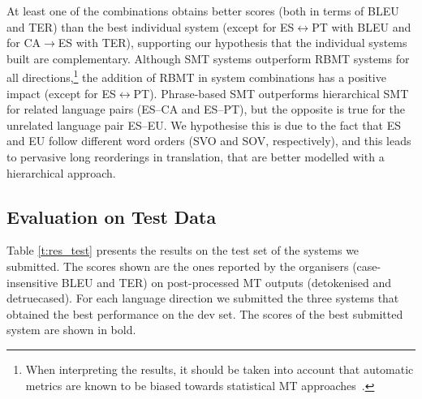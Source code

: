 \documentclass[postprint]{flammie}
\begin{document}

At least one of the combinations obtains better scores (both in terms of BLEU and TER) than the best individual system (except for ES$\leftrightarrow$PT with BLEU and for CA$\rightarrow$ES with TER), supporting our hypothesis that the individual systems built are complementary.
Although SMT systems outperform RBMT systems for all directions,\footnote{When interpreting the results, it should be taken into account that automatic metrics are known to be biased towards statistical MT approaches~\cite{E06-1032}.} the addition of RBMT in system combinations has a positive impact (except for ES$\leftrightarrow$PT).
Phrase-based SMT outperforms hierarchical SMT for related language pairs (ES--CA and ES--PT), but the opposite is true for the unrelated language pair ES--EU. We hypothesise this is due to the fact that ES and EU follow different word orders (SVO and SOV, respectively), and this leads to pervasive long reorderings in translation, that are better modelled with a hierarchical approach.

\subsection{Evaluation on Test Data}

Table \ref{t:res_test} presents the results on the test set of the systems we submitted.
The scores shown are the ones reported by the organisers (case-insensitive BLEU and TER) on post-processed MT outputs (detokenised and detruecased).
For each language direction we submitted the three systems that obtained the best performance on the dev set.
The scores of the best submitted system are shown in bold.
\end{document}
